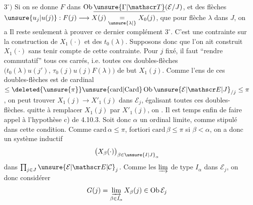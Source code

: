 $3^\circ)$ Si on se donne $F$ dans $\operatorname{Ob}\underline{\unsure{\Gamma|\mathscr T}}(\mathcal E/J)$, et des flèches $\unsure{u_j|u(j)}:F(j)\longrightarrow X(j)\underset{\unsure{\lambda|{}}}{=}X_0(j)$,  que pour  flèche $\lambda$ dans $J$, on a
Il reste seulement à prouver ce dernier complément $3^\circ$. C'est une contrainte  sur la construction de $X_1(\cdot)$ et des $t_0(\lambda)$. Supposons donc que l'on ait construit $X_1(\cdot)$ sans tenir compte de cette contrainte. Pour $j$ fixé, il faut  ``rendre commutatif'' tous ces carrés, i.e. toutes ces doubles-flèches $\bigl(t_0(\lambda)u(j'),\,\tau_0(j)u(j)F(\lambda)\bigr)$ de but $X_1(j)$. Comme l'ens de ces doubles-flèches est de cardinal $\leq\deleted{\unsure{\pi}}\unsure{\mathrm{card}|\mathrm{Card}}\operatorname{Ob}\unsure{\mathcal E|\mathscr E|J}_{/j}\leq\pi$, on peut trouver $X_1(j)\longrightarrow X'_1(j)$ dans $\mathcal E_j$, égalisant toutes ces doubles-flèches.  quitte à remplacer $X_1(j)$ par $X'_1(j)$, on .
Il est temps enfin de faire appel à l'hypothèse c) de 4.10.3. Soit donc $\alpha$ un ordinal limite, comme stipulé dans cette condition. Comme $\mathrm{card}\,\alpha\leq\pi$,  fortiori $\mathrm{card}\,\beta\leq\pi$ si $\beta<\alpha$, on a donc un système inductif
\[
 \bigl(X_\beta(\cdot)\bigr)_{\beta\in\unsure{I|J}_\alpha}
\]
dans $\prod_{j\in J}\unsure{\mathcal E|\mathscr E|\mathcal C}_j$. Comme les $\varinjlim$ de type $I_\alpha$  dans $\mathcal E_j$, on   donc considérer
\[
 G(j)=\varinjlim_{\beta\in I_\alpha}X_\beta(j)\in\operatorname{Ob}\mathcal E_j
\]

